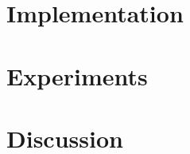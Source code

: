 \documentclass[journal]{vgtc}                %
\theoremstyle{definition}
\begin{document}
\section{Implementation}
\label{sec:implementation}


\section{Experiments}
\label{sec:experiments}


\section{Discussion}
\label{sec:discussion}





\end{document}
